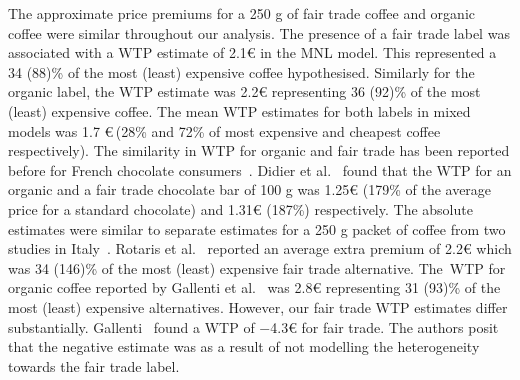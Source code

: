 \documentclass[sustainability,article,accept,moreauthors,pdftex,10pt,a4paper]{Definitions/mdpi}
\theoremstyle{mdpi}
\newcounter{ex}
\newcounter{re}
\theoremstyle{mdpidefinition}
\begin{document}
{\par{The approximate price premiums for a 250 g of fair trade coffee and organic coffee were similar throughout our analysis. The presence of a fair trade label was associated with a WTP estimate of 2.1\euro \hspace{1mm} in the MNL model. This represented a 34 (88)\% of the most (least) expensive coffee hypothesised. Similarly for the organic label, the WTP estimate was 2.2\euro \hspace{1mm} representing 36 (92)\% of the most (least) expensive coffee. The mean WTP estimates for both labels in mixed models was 1.7 \euro \,(28\% and 72\% of most expensive and cheapest coffee respectively). The similarity in WTP for organic and fair trade has been reported before for French chocolate consumers~\cite{Didier2008}. Didier et al.~\cite{Didier2008} found that the WTP for an organic and a fair trade chocolate bar of 100 g was 1.25\euro \hspace{1mm} (179\% of the average price for a standard chocolate) and 1.31\euro \hspace{1mm} (187\%) respectively. The absolute estimates were similar to separate estimates for a 250 g packet of coffee from two studies in Italy~\cite{Rotaris2011,Gallenti2016}. Rotaris et al.~\cite{Rotaris2011} reported an average extra premium of 2.2\euro \hspace{1mm} which was 34 (146)\% of the most (least) expensive fair trade alternative. The~WTP for organic coffee reported by Gallenti et al.~\cite{Gallenti2016} was 2.8\euro \hspace{1mm} representing 31 (93)\% of the most (least) expensive alternatives. However, our fair trade WTP estimates differ substantially. Gallenti~\cite{Gallenti2016} found a WTP of $-$4.3\euro \hspace{1mm} for fair trade. The authors posit that the negative estimate was as a result of not modelling the heterogeneity towards the fair trade label. }

}
\end{document}
